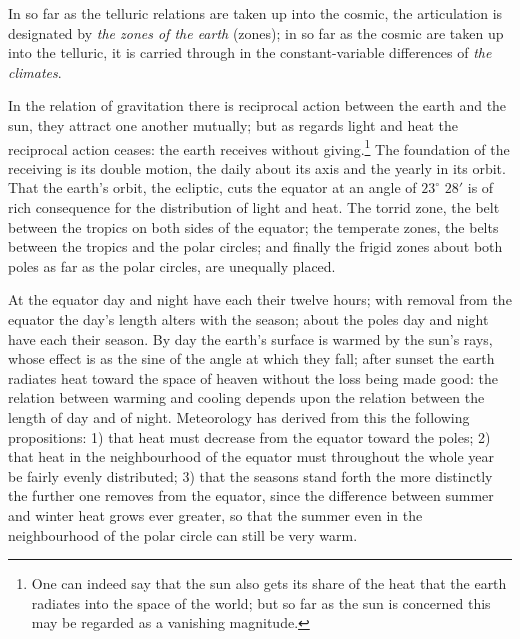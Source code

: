 \documentclass[12pt,a4paper]{book}
\begin{document}
In so far as the telluric relations are taken up into the cosmic, the articulation is designated by \emph{the zones of
the earth} (zones); in so far as the cosmic are taken up into the telluric, it is carried through in the
constant-variable differences of \emph{the climates}.

In the relation of gravitation there is reciprocal action between the earth and the sun, they attract one another
mutually; but as regards light and heat the reciprocal action ceases: the earth receives without giving.\footnote{One can
indeed say that the sun also gets its share of the heat that the earth radiates into the space of the world; but so far
as the sun is concerned this may be regarded as a vanishing magnitude.} The foundation of the receiving is its double
motion, the daily about its axis and the yearly in its orbit. That the earth's orbit, the ecliptic, cuts the equator
at an angle of $23^{\circ}$ $28'$ is of rich consequence for the distribution of light and heat. The torrid zone, the
belt between the tropics on both sides of the equator; the temperate zones, the belts between the tropics and the polar
circles; and finally the frigid zones about both poles as far as the polar circles, are unequally placed.

At the equator day and night have each their twelve hours; with removal from the equator the day's length alters with the
season; about the poles day and night have each their season. By day the earth's surface is warmed by the sun's rays,
whose effect is as the sine of the angle at which they fall; after sunset the earth radiates heat toward the space of
heaven without the loss being made good: the relation between warming and cooling depends upon the relation between the
length of day and of night. Meteorology has derived from this the following propositions: 1) that heat must decrease from
the equator toward the poles; 2) that heat in the neighbourhood of the equator must throughout the whole year be fairly
evenly distributed; 3) that the seasons stand forth the more distinctly the further one removes from the equator, since
the difference between summer and winter heat grows ever greater, so that the summer even in the neighbourhood of the
polar circle can still be very warm.
\end{document}

